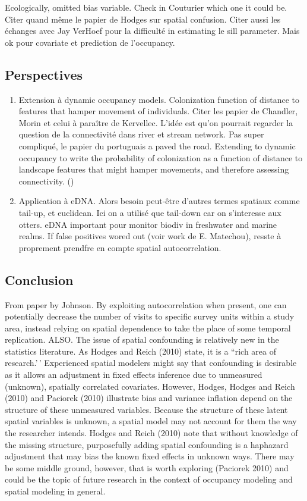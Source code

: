 \documentclass[
  11pt,
  a4paper,
]{article}
\begin{document}
Ecologically, omitted bias variable. Check in Couturier which one it could be. Citer quand même le papier de Hodges sur spatial confusion. Citer aussi les échanges avec Jay VerHoef pour la difficulté in estimating le sill parameter. Mais ok pour covariate et prediction de l'occupancy.

\subsection{Perspectives}\label{perspectives}

\begin{enumerate}
\def\labelenumi{\arabic{enumi}.}
\item
  Extension à dynamic occupancy models. Colonization function of distance to features that hamper movement of individuals. Citer les papier de Chandler, Morin et celui à paraître de Kervellec. L'idée est qu'on pourrait regarder la question de la connectivité dans river et stream network. Pas super compliqué, le papier du portuguais a paved the road. Extending to dynamic occupancy to write the probability of colonization as a function of distance to landscape features that might hamper movements, and therefore assessing connectivity. ()
\item
  Application à eDNA. Alors besoin peut-être d'autres termes spatiaux comme tail-up, et euclidean. Ici on a utilisé que tail-down car on s'interesse aux otters. eDNA important pour monitor biodiv in freshwater and marine realms. If false positives wored out (voir work de E. Matechou), resste à proprement prendfre en compte spatial autocorrelation.
\end{enumerate}

\subsection{Conclusion}\label{conclusion}

From paper by Johnson. By exploiting autocorrelation when present, one can potentially decrease the number of visits to specific survey units
within a study area, instead relying on spatial dependence to take the place of some temporal replication.
ALSO. The issue of spatial confounding is relatively new in
the statistics literature. As Hodges and Reich (2010)
state, it is a ``rich area of research.'\,' Experienced spatial
modelers might say that confounding is desirable as it
allows an adjustment in fixed effects inference due to
unmeasured (unknown), spatially correlated covariates.
However, Hodges, Hodges and Reich (2010) and
Paciorek (2010) illustrate bias and variance inflation
depend on the structure of these unmeasured variables.
Because the structure of these latent spatial variables is
unknown, a spatial model may not account for them the
way the researcher intends. Hodges and Reich (2010)
note that without knowledge of the missing structure,
purposefully adding spatial confounding is a haphazard
adjustment that may bias the known fixed effects in
unknown ways. There may be some middle ground,
however, that is worth exploring (Paciorek 2010) and
could be the topic of future research in the context of
occupancy modeling and spatial modeling in general.
\end{document}
